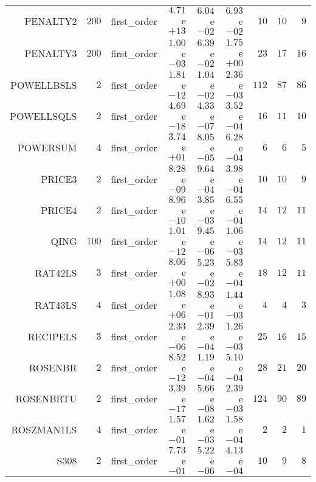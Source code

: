 \begin{longtable}{rrrrrrrrr}
PENALTY2 & \(   200\) & first\_order & \( 4.71\)e\(+13\) & \( 6.04\)e\(-02\) & \( 6.93\)e\(-02\) & \(    10\) & \(    10\) & \(     9\) \\
PENALTY3 & \(   200\) & first\_order & \( 1.00\)e\(-03\) & \( 6.39\)e\(-02\) & \( 1.75\)e\(+00\) & \(    23\) & \(    17\) & \(    16\) \\
POWELLBSLS & \(     2\) & first\_order & \( 1.81\)e\(-12\) & \( 1.04\)e\(-02\) & \( 2.36\)e\(-03\) & \(   112\) & \(    87\) & \(    86\) \\
POWELLSQLS & \(     2\) & first\_order & \( 4.69\)e\(-18\) & \( 4.33\)e\(-07\) & \( 3.52\)e\(-04\) & \(    16\) & \(    11\) & \(    10\) \\
POWERSUM & \(     4\) & first\_order & \( 3.74\)e\(+01\) & \( 8.05\)e\(-05\) & \( 6.28\)e\(-04\) & \(     6\) & \(     6\) & \(     5\) \\
PRICE3 & \(     2\) & first\_order & \( 8.28\)e\(-09\) & \( 9.64\)e\(-04\) & \( 3.98\)e\(-04\) & \(    10\) & \(    10\) & \(     9\) \\
PRICE4 & \(     2\) & first\_order & \( 8.96\)e\(-10\) & \( 3.85\)e\(-03\) & \( 6.55\)e\(-04\) & \(    14\) & \(    12\) & \(    11\) \\
QING & \(   100\) & first\_order & \( 1.01\)e\(-12\) & \( 9.45\)e\(-06\) & \( 1.06\)e\(-03\) & \(    14\) & \(    12\) & \(    11\) \\
RAT42LS & \(     3\) & first\_order & \( 8.06\)e\(+00\) & \( 5.23\)e\(-02\) & \( 5.83\)e\(-04\) & \(    18\) & \(    12\) & \(    11\) \\
RAT43LS & \(     4\) & first\_order & \( 1.08\)e\(+06\) & \( 8.93\)e\(-01\) & \( 1.44\)e\(-03\) & \(     4\) & \(     4\) & \(     3\) \\
RECIPELS & \(     3\) & first\_order & \( 2.33\)e\(-06\) & \( 2.39\)e\(-04\) & \( 1.26\)e\(-03\) & \(    25\) & \(    16\) & \(    15\) \\
ROSENBR & \(     2\) & first\_order & \( 8.52\)e\(-12\) & \( 1.19\)e\(-04\) & \( 5.10\)e\(-04\) & \(    28\) & \(    21\) & \(    20\) \\
ROSENBRTU & \(     2\) & first\_order & \( 3.39\)e\(-17\) & \( 5.66\)e\(-08\) & \( 2.39\)e\(-03\) & \(   124\) & \(    90\) & \(    89\) \\
ROSZMAN1LS & \(     4\) & first\_order & \( 1.57\)e\(-01\) & \( 1.62\)e\(-03\) & \( 1.58\)e\(-04\) & \(     2\) & \(     2\) & \(     1\) \\
S308 & \(     2\) & first\_order & \( 7.73\)e\(-01\) & \( 5.22\)e\(-06\) & \( 4.13\)e\(-04\) & \(    10\) & \(     9\) & \(     8\) \\

\end{longtable}
